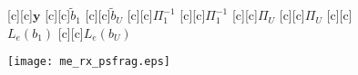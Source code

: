 \documentclass{article}
\begin{document}
\begin{figure}[htb]
  \begin{center}

        [c][c]{$\mathrm{\mathbf{y}}$}
        [c][c]{$\tilde{b}_1$}
        [c][c]{$\tilde{b}_U$}
        [c][c]{$\Pi_1^{-1}$}
        [c][c]{$\Pi_1^{-1}$}
        [c][c]{$\Pi_U$}
        [c][c]{$\Pi_U$}
        [c][c]{\hspace{2mm}$L_e(b_1)$}
        [c][c]{\hspace{2mm}$L_e(b_U)$}

    \texttt{[image: me\_rx\_psfrag.eps]}
    \end{center}
\end{figure}
\end{document}
